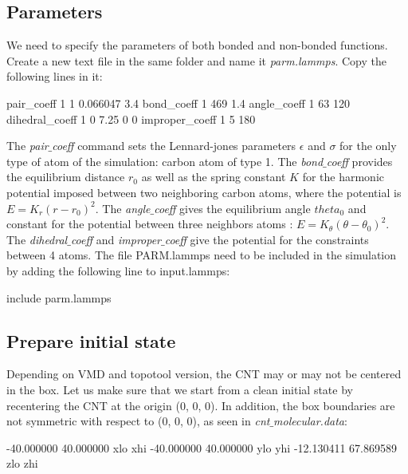 \noindent \subsection{Parameters}

We need to specify the parameters of both bonded and
non-bonded functions. Create a new text file in the same
folder and name it \textit{parm.lammps}. Copy the following lines
in it:

\begin{lcverbatim}
pair_coeff 1 1 0.066047 3.4
bond_coeff 1 469 1.4
angle_coeff 1 63 120
dihedral_coeff 1 0 7.25 0 0
improper_coeff 1 5 180
\end{lcverbatim}

\noindent The \textit{pair$\_$coeff} command sets the Lennard-jones parameters
$\epsilon$ and $\sigma$ for the only type of
atom of the simulation: carbon atom of type 1. The
\textit{bond$\_$coeff} provides the equilibrium distance $r_0$ as
well as the spring constant $K$ for the harmonic
potential imposed between two neighboring carbon atoms,
where the potential is $E = K_r ( r - r_0)^2$. The
\textit{angle$\_$coeff} gives the equilibrium angle $theta_0$ and
constant for the potential between three neighbors atoms :
$E = K_\theta ( \theta - \theta_0)^2$. The \textit{dihedral$\_$coeff}
and \textit{improper$\_$coeff} give the potential for the constraints
between 4 atoms. The file PARM.lammps need to be included in the
simulation by adding the following line to input.lammps:

\begin{lcverbatim}
include parm.lammps
\end{lcverbatim}

\noindent \subsection{Prepare initial state}

Depending on VMD and topotool version, the CNT may or may not be centered in 
the box. Let us make sure that we start from a clean initial state by
recentering the CNT at the origin (0, 0, 0). In addition, the box boundaries 
are not symmetric with respect to (0, 0, 0), as seen in \textit{cnt$\_$molecular.data}:

\begin{lcverbatim}
-40.000000 40.000000  xlo xhi
-40.000000 40.000000  ylo yhi
-12.130411 67.869589  zlo zhi

\end{lcverbatim}

